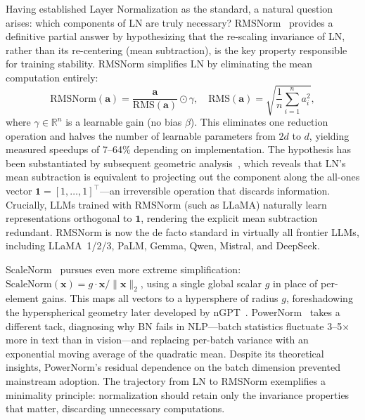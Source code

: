 Having established Layer Normalization as the standard, a natural question arises: which components of LN are truly necessary?
RMSNorm~\cite{zhang2019root} provides a definitive partial answer by hypothesizing that the re-scaling invariance of LN, rather than its re-centering (mean subtraction), is the key property responsible for training stability.
RMSNorm simplifies LN by eliminating the mean computation entirely:
\begin{equation}
    \text{RMSNorm}(\mathbf{a}) = \frac{\mathbf{a}}{\text{RMS}(\mathbf{a})} \odot \gamma, \quad \text{RMS}(\mathbf{a}) = \sqrt{\frac{1}{n}\sum_{i=1}^{n} a_i^2},
\end{equation}
where $\gamma \in \mathbb{R}^n$ is a learnable gain (no bias $\beta$).
This eliminates one reduction operation and halves the number of learnable parameters from $2d$ to $d$, yielding measured speedups of 7--64\% depending on implementation.
The hypothesis has been substantiated by subsequent geometric analysis~\cite{gupta2024reintroducing}, which reveals that LN's mean subtraction is equivalent to projecting out the component along the all-ones vector $\mathbf{1} = [1, \ldots, 1]^\top$---an irreversible operation that discards information.
Crucially, LLMs trained with RMSNorm (such as LLaMA) naturally learn representations orthogonal to $\mathbf{1}$, rendering the explicit mean subtraction redundant.
RMSNorm is now the de facto standard in virtually all frontier LLMs, including LLaMA~1/2/3, PaLM, Gemma, Qwen, Mistral, and DeepSeek.

ScaleNorm~\cite{nguyen2019transformers} pursues even more extreme simplification: $\text{ScaleNorm}(\mathbf{x}) = g \cdot \mathbf{x} / \|\mathbf{x}\|_2$, using a single global scalar $g$ in place of per-element gains.
This maps all vectors to a hypersphere of radius $g$, foreshadowing the hyperspherical geometry later developed by nGPT~\cite{loshchilov2024ngpt}.
PowerNorm~\cite{shen2020powernorm} takes a different tack, diagnosing why BN fails in NLP---batch statistics fluctuate 3--5$\times$ more in text than in vision---and replacing per-batch variance with an exponential moving average of the quadratic mean.
Despite its theoretical insights, PowerNorm's residual dependence on the batch dimension prevented mainstream adoption.
The trajectory from LN to RMSNorm exemplifies a minimality principle: normalization should retain only the invariance properties that matter, discarding unnecessary computations.

